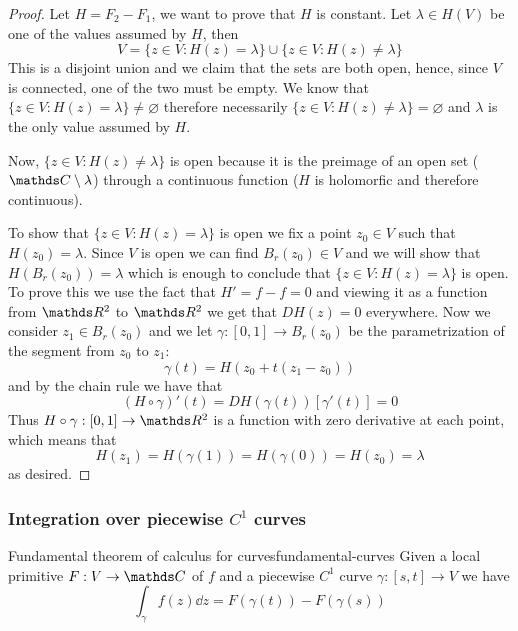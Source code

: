 \documentclass[12pt]{extarticle}
\begin{document}
\begin{proof}
	Let $H = F_2 - F_1$, we want to prove that $H$ is constant.
	Let $\lambda \in H(V)$ be one of the values assumed by $H$, then
	\begin{equation}
		V = \{ z \in V : H(z) = \lambda \} \cup \{ z \in V : H(z) \neq \lambda \}
	\end{equation}
	This is a disjoint union and we claim that the sets are both open, hence, since $V$ is connected,
	one of the two must be empty.
	We know that $\{ z \in V : H(z) = \lambda \} \neq \varnothing$ therefore necessarily
	$\{ z \in V : H(z) \neq \lambda \} = \varnothing$ and $\lambda$ is the only value assumed by $H$.

	Now, $\{ z \in V : H(z) \neq \lambda \}$ is open because it is the preimage of an open set
	($\C \setminus \lambda$) through a continuous function
	($H$ is holomorfic and therefore continuous).

	To show that $\{ z \in V : H(z) = \lambda \}$ is open we fix a point $z_0 \in V$ such that
	$H(z_0) = \lambda$. Since $V$ is open we can find $B_r(z_0) \in V$ and we will show that
	$H(B_r(z_0)) = \lambda$ which is enough to conclude that $\{ z \in V : H(z) = \lambda \}$ is open.
	To prove this we use the fact that $H' = f - f = 0$ and viewing it as a function from $\R^2$ to
	$\R^2$ we get that $DH(z) = 0$ everywhere.
	Now we consider $z_1 \in B_r(z_0)$ and we let $\gamma: [0,1] \to B_r(z_0)$ be the parametrization
	of the segment from $z_0$ to $z_1$:
	\begin{equation}
		\gamma(t) = H(z_0 + t(z_1 - z_0))
	\end{equation}
	and by the chain rule we have that
	\begin{equation}
		(H\circ \gamma)'(t) = DH(\gamma(t)) [\gamma'(t)] = 0
	\end{equation}
	Thus $H \circ \gamma: [0, 1] \to \R^2$ is a function with zero derivative at each point,
	which means that
	\begin{equation}
		H(z_1) = H(\gamma(1)) = H(\gamma(0)) = H(z_0) = \lambda
	\end{equation}
	as desired.
\end{proof}

\subsubsection{Integration over piecewise \texorpdfstring{$C^1$}{C1} curves}

\begin{proposition}{Fundamental theorem of calculus for curves}{fundamental-curves}
	Given a local primitive $F: V \to \C$ of $f$ and a piecewise $C^1$ curve $\gamma: [s, t] \to V$
	we have
	\begin{equation}
		\int_\gamma f(z) \dd z = F(\gamma(t)) - F(\gamma(s))
	\end{equation}
\end{proposition}
\end{document}
